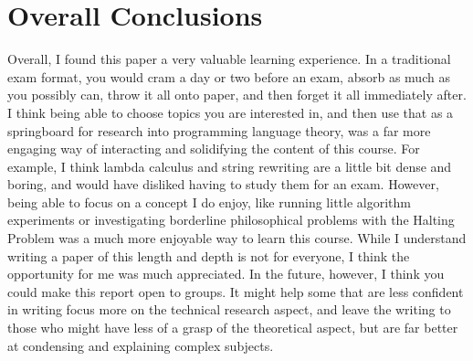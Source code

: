 \documentclass{article}
\begin{document}
\section{Overall Conclusions}\label{conclusions}
Overall, I found this paper a very valuable learning experience. In a traditional exam format, you would cram a day or two before an exam, absorb as much as you possibly can, throw it all onto paper, and then forget it all immediately after. I think being able to choose topics you are interested in, and then use that as a springboard for research into programming language theory, was a far more engaging way of interacting and solidifying the content of this course. For example, I think lambda calculus and string rewriting are a little bit dense and boring, and would have disliked having to study them for an exam. However, being able to focus on a concept I do enjoy, like running little algorithm experiments or investigating borderline philosophical problems with the Halting Problem was a much more enjoyable way to learn this course. While I understand writing a paper of this length and depth is not for everyone, I think the opportunity for me was much appreciated. In the future, however, I think you could  make this report open to groups. It might help some that are less confident in writing focus more on the technical research aspect, and leave the writing to those who might have less of a grasp of the theoretical aspect, but are far better at condensing and explaining complex subjects. 

\newpage
\end{document}
